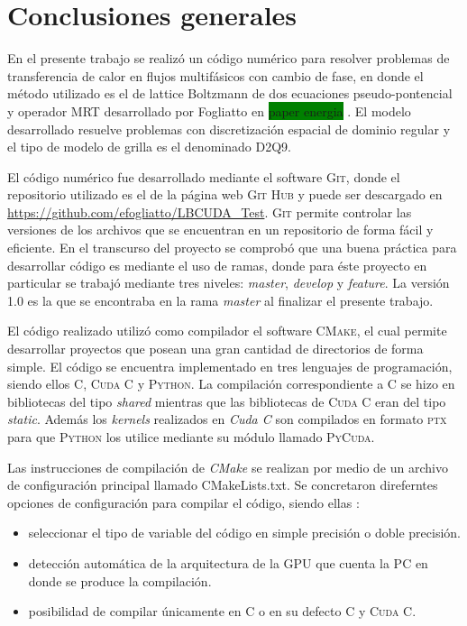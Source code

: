 \chapter{Conclusiones generales}
\graphicspath{{figs/cap4/}}
\label{cap5}

En el presente trabajo se realizó un código numérico para resolver problemas de transferencia de calor en flujos multifásicos con cambio de fase, en donde el método utilizado es el de lattice Boltzmann de dos ecuaciones pseudo-pontencial y operador MRT desarrollado por Fogliatto en \colorbox{green}{paper energia} . El modelo desarrollado resuelve problemas con discretización espacial de dominio regular y el tipo de modelo de grilla es el denominado D2Q9.

El código numérico fue desarrollado mediante el software \textsc{Git}, donde el repositorio utilizado es el de la página web \textsc{Git Hub} y puede ser descargado en \url{https://github.com/efogliatto/LBCUDA_Test}. \textsc{Git} permite controlar las versiones de los archivos que se encuentran en un repositorio de forma fácil y eficiente. En el transcurso del proyecto se comprobó que una buena práctica para desarrollar código es mediante el uso de ramas, donde para éste proyecto en particular se trabajó mediante tres niveles: \textit{master}, \textit{develop} y \textit{feature}. La versión 1.0 es la que se encontraba en la rama \textit{master} al finalizar el presente trabajo.

El código realizado utilizó como compilador el software \textsc{CMake}, el cual permite desarrollar proyectos que posean una gran cantidad de directorios de forma simple. El código se encuentra implementado en tres lenguajes de programación, siendo ellos \textsc{C}, \textsc{Cuda C} y \textsc{Python}. La compilación correspondiente a \textsc{C} se hizo en bibliotecas del tipo \textit{shared} mientras que las bibliotecas de \textsc{Cuda C} eran del tipo \textit{static}. Además los \textit{kernels} realizados en \textit{Cuda C} son compilados en formato \textsc{ptx} para que \textsc{Python} los utilice mediante su módulo llamado \textsc{PyCuda}.

Las instrucciones de compilación de \textit{CMake} se realizan por medio de un archivo de configuración principal llamado CMakeLists.txt. Se concretaron direferntes opciones de configuración para compilar el código, siendo ellas :

\begin{itemize}
	\item seleccionar el tipo de variable del código en simple precisión o doble precisión. 
	\item detección automática de la arquitectura de la GPU que cuenta la PC en donde se produce la compilación.
	\item posibilidad de compilar únicamente en \textsc{C} o en su defecto \textsc{C} y \textsc{Cuda C}.
\end{itemize}

